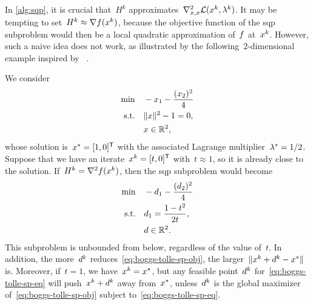 In \cref{alg:sqp}, it is crucial that~$H^k$ approximates~$\nabla_{x, x}^2 \lag(\iter[k], \lm[k])$.
It may be tempting to set~$H^k \approx \nabla \obj(\iter[k])$, because the objective function of the \gls{sqp} subproblem would then be a local quadratic approximation of~$f$ at~$\iter[k]$.
However, such a naive idea does not work, as illustrated by the following~$2$-dimensional example inspired by \citeauthor{Boggs_Tolle_1995}~\cite[\S~2.2]{Boggs_Tolle_1995}.

We consider
\begin{align*}
    \min        & \quad -\iter_1 - \frac{(\iter_2)^2}{4}\\
    \text{s.t.} & \quad \norm{\iter}^2 - 1 = 0,\\
                & \quad \iter \in \R^2,
\end{align*}
whose solution is~$\iter[\ast] = [1, 0]^{\T}$ with the associated Lagrange multiplier~$\lm[\ast] = 1/2$.
Suppose that we have an iterate~$\iter[k] = [t, 0]^{\T}$ with~$t \approx 1$, so it is already close to the solution.
If~$H^k = \nabla^2 \obj(\iter[k])$, then the \gls{sqp} subproblem would become
\begin{subequations}
    \begin{align}
        \min        & \quad -\step_1 - \frac{(\step_2)^2}{4} \label{eq:boggs-tolle-sp-obj}\\
        \text{s.t.} & \quad \step_1 = \frac{1 - t^2}{2 t}, \label{eq:boggs-tolle-sp-eq}\\
                    & \quad \step \in \R^2. \nonumber
    \end{align}
\end{subequations}
This subproblem is unbounded from below, regardless of the value of~$t$.
In addition, the more~$\step[k]$ reduces~\cref{eq:boggs-tolle-sp-obj}, the larger~$\norm{\iter[k] + \step[k] - \iter[\ast]}$ is.
Moreover, if~$t = 1$, we have~$\iter[k] = \iter[\ast]$, but any feasible point~$\step[k]$ for~\cref{eq:boggs-tolle-sp-eq} will push~$\iter[k] + \step[k]$ away from~$\iter[\ast]$, unless~$\step[k]$ is the global maximizer of~\cref{eq:boggs-tolle-sp-obj} subject to~\cref{eq:boggs-tolle-sp-eq}.

